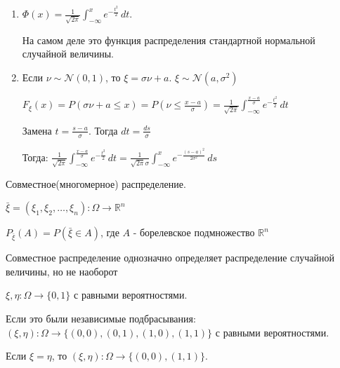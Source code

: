\begin{example}
    \begin{remark}
        \begin{enumerate}
            \item {
                $\Phi (x) = \frac{1}{\sqrt{2 \pi}} \int_{-\infty}^{x} e^{-\frac{t^2}{2}} \, dt$.

                На самом деле это функция распределения стандартной нормальной случайной величины.
            }
            \item {
                Если $\nu \sim \mathcal{N}(0, 1)$, то $\xi = \sigma \nu + a$. $\xi \sim \mathcal{N}(a, \sigma^2)$

                $F_{\xi} (x) = P(\sigma \nu + a \leqslant x) = P(\nu \leqslant \frac{x - a}{\sigma}) = \frac{1}{\sqrt{2 \pi}} 
                \int_{-\infty}^{\frac{x - a}{\sigma}} e^{-\frac{t^2}{2}} \, dt$

                Замена $t = \frac{s - a}{\sigma}$. Тогда $dt = \frac{ds}{\sigma}$

                Тогда: $\frac{1}{\sqrt{2 \pi}} 
                \int_{-\infty}^{\frac{x - a}{\sigma}} e^{-\frac{t^2}{2}} \, dt = \frac{1}{\sqrt{2\pi} \sigma}
                \int_{-\infty}^{x} e^{-\frac{(s - a)^2}{2\sigma^2}} \, ds$
            }
        \end{enumerate}
    
    \end{remark}
\end{example}


\begin{definition}
    Совместное(многомерное) распределение.

    $\bar{\xi} = (\xi_1, \xi_2, \ldots, \xi_n) : \Omega \to \mathbb{R}^n$

    $P_{\bar{\xi}} (A) = P(\bar{\xi} \in A)$, где $A$ - борелевское подмножество $\mathbb{R}^n$ 

    \begin{remark}
        Совместное распределение однозначно определяет распределение случайной
        величины, но не наоборот

        \begin{example}
            $\xi, \eta : \Omega \to \{ 0, 1 \}$  с равными вероятностями.

            Если это были независимые подбрасывания: $(\xi, \eta) : \Omega \to
            \{ (0, 0), (0, 1), (1, 0), (1, 1) \}$  с равными вероятностями.

            Если $\xi = \eta$, то $(\xi, \eta) : \Omega \to \{ (0, 0), (1, 1) \}$.

        \end{example}
    \end{remark}
\end{definition}

